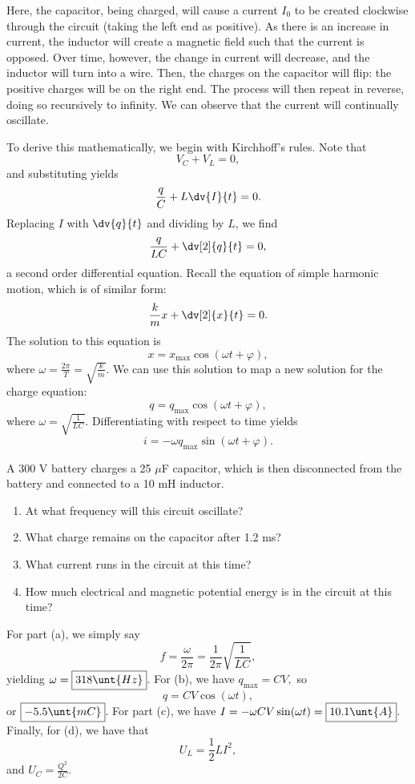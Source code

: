 \documentclass[11pt]{article}
\begin{document}
Here, the capacitor, being charged, will cause a current $I_0$ to be created clockwise through the circuit (taking the left end as positive). As there is an increase in current, the inductor will create a magnetic field such that the current is opposed. Over time, however, the change in current will decrease, and the inductor will turn into a wire. Then, the charges on the capacitor will flip: the positive charges will be on the right end. The process will then repeat in reverse, doing so recursively to infinity. We can observe that the current will continually oscillate.

To derive this mathematically, we begin with Kirchhoff's rules. Note that
\[V_{C} + V_{L} = 0,\]
and substituting yields
\[\frac{q}{C} + L\dv{I}{t} = 0.\]
Replacing $I$ with $\dv{q}{t}$ and dividing by $L$, we find
\[\frac{q}{LC} + \dv[2]{q}{t} = 0,\]
a second order differential equation. Recall the equation of simple harmonic motion, which is of similar form:
\[\frac{k}{m}x + \dv[2]{x}{t} = 0.\]
The solution to this equation is
\[x = x_{\max}\cos(\omega t + \varphi),\]
where $\omega = \frac{2\pi}{T} = \sqrt{\frac{k}{m}}$. We can use this solution to map a new solution for the charge equation:
\begin{equation}
    q = q_{\max}\cos(\omega t + \varphi),
\end{equation}
where $\omega = \sqrt{\frac{1}{LC}}$. Differentiating with respect to time yields
\begin{equation}
    i = -\omega q_{\max}\sin(\omega t + \varphi).
\end{equation}
\begin{example}
    A 300 V battery charges a 25 $\mu$F capacitor, which is then disconnected from the battery and connected to a 10 mH inductor.
    \begin{enumerate}[label=(\alph*), noitemsep, topsep = 5pt]
        \item At what frequency will this circuit oscillate?
        \item What charge remains on the capacitor after 1.2 ms?
        \item What current runs in the circuit at this time?
        \item How much electrical and magnetic potential energy is in the circuit at this time?
    \end{enumerate}
\end{example}
\begin{solution}
    For part (a), we simply say
    \[f = \frac{\omega}{2\pi} = \frac{1}{2\pi}\sqrt{\frac{1}{LC}},\]
    yielding $\omega = \boxed{318\unt{Hz}}$. For (b), we have $q_{\max} = CV,$ so
    \[q = CV\cos(\omega t),\]
    or $\boxed{-5.5\unt{mC}}$. For part (c), we have $I = -\omega CV\sin(\omega t) = \boxed{10.1\unt{A}}$. Finally, for (d), we have that
    \[U_{L} = \frac{1}{2}LI^2,\]
    and $U_C = \frac{Q^2}{2C}.$
\end{solution}
\end{document}
